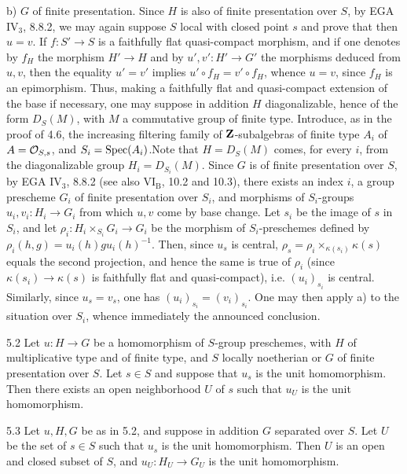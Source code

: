 b) $G$ of finite presentation. Since $H$ is also of finite presentation over $S$, by EGA IV$_3$, 8.8.2, we may again suppose $S$ local with closed point $s$ and prove that then $u=v$. If $f:S'\to S$ is a faithfully flat quasi-compact morphism, and if one denotes by $f_H$ the morphism $H'\to H$ and by $u',v':H'\to G'$ the morphisms deduced from $u,v$, then the equality $u'=v'$ implies $u'\circ f_H=v'\circ f_H$, whence $u=v$, since $f_H$ is an epimorphism. Thus, making a faithfully flat and quasi-compact extension of the base if necessary, one may suppose in addition $H$ diagonalizable, hence of the form $D_S(M)$, with $M$ a commutative group of finite type.
Introduce, as in the proof of 4.6, the increasing filtering family of $\mathbf{Z}$-subalgebras of finite type $A_i$ of $A=\mathcal{O}_{S,s}$, and $S_i=\operatorname{Spec}(A_i)$.\footnotemark[\value{footnote}] Note that $H=D_S(M)$ comes, for every $i$, from the diagonalizable group $H_i=D_{S_i}(M)$. Since $G$ is of finite presentation over $S$, by EGA IV$_3$, 8.8.2 (see also VI$_{\mathrm B}$, 10.2 and 10.3), there exists an index $i$, a group prescheme $G_i$ of finite presentation over $S_i$, and morphisms of $S_i$-groups $u_i,v_i:H_i\to G_i$ from which $u,v$ come by base change. Let $s_i$ be the image of $s$ in $S_i$, and let $\rho_i:H_i\times_{S_i}G_i\to G_i$ be the morphism of $S_i$-preschemes defined by $\rho_i(h,g)=u_i(h)g u_i(h)^{-1}$. Then, since $u_s$ is central, $\rho_s=\rho_i\times_{\kappa(s_i)}\kappa(s)$ equals the second projection, and hence the same is true of $\rho_i$ (since $\kappa(s_i)\to\kappa(s)$ is faithfully flat and quasi-compact), i.e. $(u_i)_{s_i}$ is central. Similarly, since $u_s=v_s$, one has $(u_i)_{s_i}=(v_i)_{s_i}$. One may then apply a) to the situation over $S_i$, whence immediately the announced conclusion.
\begin{corollary}{5.2}\label{IX.5.2}
Let $u:H\to G$ be a homomorphism of $S$-group preschemes, with $H$ of multiplicative type and of finite type, and $S$ locally noetherian or $G$ of finite presentation over $S$. Let $s\in S$ and suppose that $u_s$ is the unit homomorphism. Then there exists an open neighborhood $U$ of $s$ such that $u_U$ is the unit homomorphism.
\end{corollary}
\begin{corollary}{5.3}\label{IX.5.3}
Let $u,H,G$ be as in 5.2, and suppose in addition $G$ separated over $S$. Let $U$ be the set of $s\in S$ such that $u_s$ is the unit homomorphism. Then $U$ is an open and closed subset of $S$, and $u_U:H_U\to G_U$ is the unit homomorphism.
\end{corollary}
